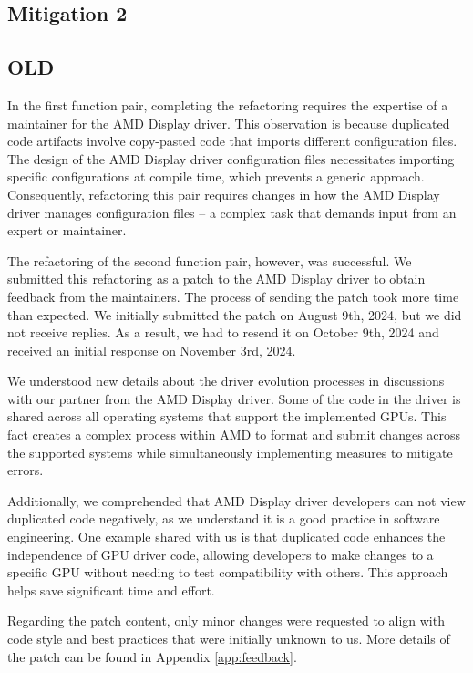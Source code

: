 \subsection{Mitigation 2}


\subsection{OLD}

In the first function pair, completing the refactoring requires the expertise of a maintainer for the AMD Display driver. This observation is because duplicated code artifacts involve copy-pasted code that imports different configuration files. The design of the AMD Display driver configuration files necessitates importing specific configurations at compile time, which prevents a generic approach. Consequently, refactoring this pair requires changes in how the AMD Display driver manages configuration files -- a complex task that demands input from an expert or maintainer.

The refactoring of the second function pair, however, was successful. We submitted this refactoring as a patch to the AMD Display driver to obtain feedback from the maintainers. The process of sending the patch took more time than expected. We initially submitted the patch on August 9th, 2024, but we did not receive replies. As a result, we had to resend it on October 9th, 2024 and received an initial response on November 3rd, 2024. 

We understood new details about the driver evolution processes in discussions with our partner from the AMD Display driver. Some of the code in the driver is shared across all operating systems that support the implemented GPUs. This fact creates a complex process within AMD to format and submit changes across the supported systems while simultaneously implementing measures to mitigate errors.

Additionally, we comprehended that AMD Display driver developers can not view duplicated code negatively, as we understand it is a good practice in software engineering. One example shared with us is that duplicated code enhances the independence of GPU driver code, allowing developers to make changes to a specific GPU without needing to test compatibility with others. This approach helps save significant time and effort. 

Regarding the patch content, only minor changes were requested to align with code 
style and best practices that were initially unknown to us. More details of the 
patch can be found in Appendix \ref{app:feedback}.


